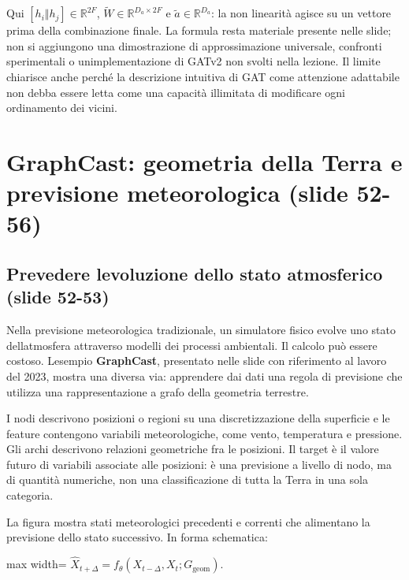 \documentclass[11pt,a4paper,oneside,openany]{book}
\begin{document}
Qui \([h_i\Vert h_j]\in\mathbb R^{2F}\), \(\widetilde W\in\mathbb R^{D_a\times2F}\) e \(\widetilde a\in\mathbb R^{D_a}\): la non linearità agisce su un vettore prima della combinazione finale. La formula resta materiale presente nelle slide; non si aggiungono una dimostrazione di approssimazione universale, confronti sperimentali o un\textquotesingle implementazione di GATv2 non svolti nella lezione. Il limite chiarisce anche perché la descrizione intuitiva di GAT come attenzione adattabile non debba essere letta come una capacità illimitata di modificare ogni ordinamento dei vicini.

\section{GraphCast: geometria della Terra e previsione meteorologica (slide 52-56)}\label{f05-n30-r994}

\subsection{Prevedere l\textquotesingle evoluzione dello stato atmosferico (slide 52-53)}\label{f05-n30-r996}

Nella previsione meteorologica tradizionale, un simulatore fisico evolve uno stato dell\textquotesingle atmosfera attraverso modelli dei processi ambientali. Il calcolo può essere costoso. L\textquotesingle esempio \textbf{GraphCast}, presentato nelle slide con riferimento al lavoro del 2023, mostra una diversa via: apprendere dai dati una regola di previsione che utilizza una rappresentazione a grafo della geometria terrestre.

I nodi descrivono posizioni o regioni su una discretizzazione della superficie e le feature contengono variabili meteorologiche, come vento, temperatura e pressione. Gli archi descrivono relazioni geometriche fra le posizioni. Il target è il valore futuro di variabili associate alle posizioni: è una previsione a livello di nodo, ma di quantità numeriche, non una classificazione di tutta la Terra in una sola categoria.

La figura mostra stati meteorologici precedenti e correnti che alimentano la previsione dello stato successivo. In forma schematica:

\begin{center}
\begin{adjustbox}{max width=\linewidth}
$\displaystyle \widehat X_{t+\Delta}=f_\theta(X_{t-\Delta},X_t;G_{\mathrm{geom}}).$
\end{adjustbox}
\end{center}
\end{document}
